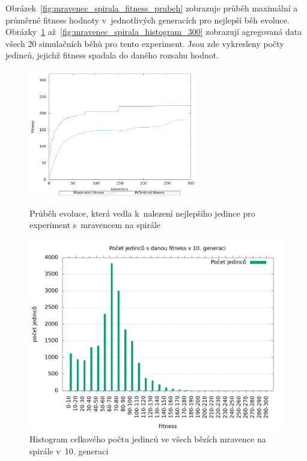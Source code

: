 Obrázek~\ref{fig:mravenec_spirala_fitness_prubeh} zobrazuje průběh maximální a průměrné fitness hodnoty v~jednotlivých generacích pro nejlepší běh evoluce.
Obrázky~\ref{fig:mravenec_spirala_histogram_10} až~\ref{fig:mravenec_spirala_histogram_300} zobrazují agregovaná data všech 20 simulačních běhů pro tento experiment.
Jsou zde vykresleny počty jedinců, jejichž fitness spadala do daného rozsahu hodnot.

\begin{figure}[h]
    \begin{minipage}[c]{0.48\linewidth}
    {\includegraphics[width=20em]{obrazky/mravenec_spirala_fitness_prubeh.png}}
        \caption{
        Průběh evoluce, která vedla k~nalezení nejlepšího jedince pro experiment s~mravencem na spirále
        }
        \label{fig:mravenec_spirala_fitness_prubeh}
    \end{minipage}
    \hfill
    \begin{minipage}[c]{0.48\linewidth}
        \includegraphics[width=\linewidth]{obrazky/mravenec_spirala_fitnessHistogram10.png}
        \caption{Histogram celkového počtu jedinců ve všech bězích mravence na spirále v~10. generaci}
        \label{fig:mravenec_spirala_histogram_10}
    \end{minipage}
\end{figure}

